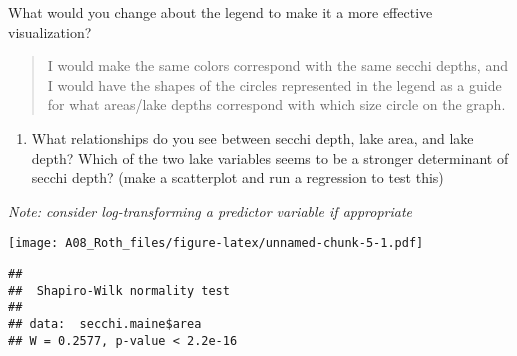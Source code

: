 \documentclass[]{article}
\newenvironment{Shaded}{\begin{snugshade}}{\end{snugshade}}
\newcommand{\KeywordTok}[1]{\textcolor[rgb]{0.13,0.29,0.53}{\textbf{#1}}}
\newcommand{\NormalTok}[1]{#1}
\newcommand{\OperatorTok}[1]{\textcolor[rgb]{0.81,0.36,0.00}{\textbf{#1}}}
\providecommand{\tightlist}{%
  \setlength{\itemsep}{0pt}\setlength{\parskip}{0pt}}
\begin{document}
What would you change about the legend to make it a more effective
visualization?

\begin{quote}
I would make the same colors correspond with the same secchi depths, and
I would have the shapes of the circles represented in the legend as a
guide for what areas/lake depths correspond with which size circle on
the graph.
\end{quote}

\begin{enumerate}
\def\labelenumi{\arabic{enumi}.}
\setcounter{enumi}{8}
\tightlist
\item
  What relationships do you see between secchi depth, lake area, and
  lake depth? Which of the two lake variables seems to be a stronger
  determinant of secchi depth? (make a scatterplot and run a regression
  to test this)
\end{enumerate}

\emph{Note: consider log-transforming a predictor variable if
appropriate}

\begin{Shaded}
\end{Shaded}

\texttt{[image: A08\_Roth\_files/figure-latex/unnamed-chunk-5-1.pdf]}

\begin{Shaded}
\end{Shaded}

\begin{verbatim}
## 
##  Shapiro-Wilk normality test
## 
## data:  secchi.maine$area
## W = 0.2577, p-value < 2.2e-16
\end{verbatim}

\begin{Shaded}
\end{Shaded}
\end{document}
